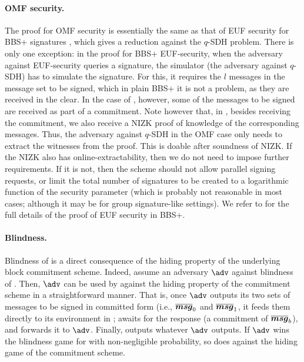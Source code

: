 \paragraph{OMF security.} The proof for OMF security is essentially the
same as that of EUF security for BBS+ signatures \cite{cdl16b}, which gives a
reduction against the $q$-SDH problem. There is only one exception: in the proof
for BBS+ EUF-security, when the adversary against EUF-security queries a
signature, the simulator (the adversary against $q$-SDH) has to simulate the
signature. For this, it requires the $l$ messages in the message set to be
signed, which in plain BBS+ it is not a problem, as they are received in the
clear. In the case of \SBCM, however, some of the messages to be signed are
received as part of a commitment. Note however that, in \SBCM, besides receiving
the commitment, we also receive a NIZK proof of knowledge of the corresponding
messages. Thus, the adversary against $q$-SDH in the OMF case only needs to
extract the witnesses from the proof. This is doable after soundness of NIZK.
If the NIZK also has online-extractability, then we do not need to impose
further requirements. If it is not, then the \SBCM scheme should not allow
parallel signing requests, or limit the total number of signatures to be
created to a logarithmic function of the security parameter (which is probably
not reasonable in most cases; although it may be for group signature-like
settings). We refer to \cite[Lemma 1]{cdl16b} for the full details of the proof
of EUF security in BBS+.
%

\paragraph{Blindness.} Blindness of \SBCM is a direct consequence of the
hiding property of the underlying block commitment scheme. Indeed, assume an
adversary $\adv$ against blindness of \SBCM. Then, $\adv$ can be used by
\advB against the hiding property of the commitment scheme in a straightforward
manner. That is, once $\adv$ outputs its two sets of messages to be signed in
committed form (i.e., $\overline{\boldsymbol{msg}}_0$ and $\overline{\boldsymbol{msg}}_1$, it feeds
them directly to its environment in \ExpComHideb; \advB awaits for the response
(a commitment of $\overline{\boldsymbol{msg}}_b$), and forwards it to $\adv$. Finally,
\advB outputs whatever $\adv$ outputs. If $\adv$ wins the blindness
game for \SBCM with non-negligible probability, so does \advB against the hiding
game of the commitment scheme.

